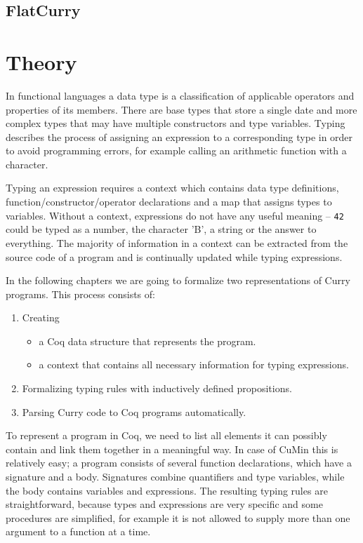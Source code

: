 \documentclass[fleqn]{scrreprt}
\newcommand{\coqinline}[1]{\texttt{#1}}
\begin{document}
\section{FlatCurry}
\chapter{Theory}
\label{theory}
In functional languages a data type is a classification of applicable operators and properties of its members. There are base types that store a single date and more complex types that may have multiple constructors and type variables. Typing describes the process of assigning an expression to a corresponding type in order to avoid programming errors, for example calling an arithmetic function with a character.
\par
Typing an expression requires a context which contains data type definitions, function/constructor/operator declarations and a map that assigns types to variables.  Without a context, expressions do not have any useful meaning -- \coqinline{42} could be typed as a number, the character 'B', a string or the answer to everything. The majority of information in a context can be extracted from the source code of a program and is continually updated while typing expressions.
\par
In the following chapters we are going to formalize two representations of Curry programs. This process consists of:
\begin{enumerate}
	\item Creating \begin{itemize}
		              \item a Coq data structure that represents the program.
		              \item a context that contains all necessary information for typing expressions.
		           \end{itemize}
	\item Formalizing typing rules with inductively defined propositions.
	\item Parsing Curry code to Coq programs automatically.
\end{enumerate}
To represent a program in Coq, we need to list all elements it can possibly contain and link them together in a meaningful way. In case of CuMin this is relatively easy; a program consists of several function declarations, which have a signature and a body. Signatures combine quantifiers and type variables, while the body contains variables and expressions. The resulting typing rules are straightforward, because types and expressions are very specific and some procedures are simplified, for example it is not allowed to supply more than one argument to a function at a time. 
\end{document}
